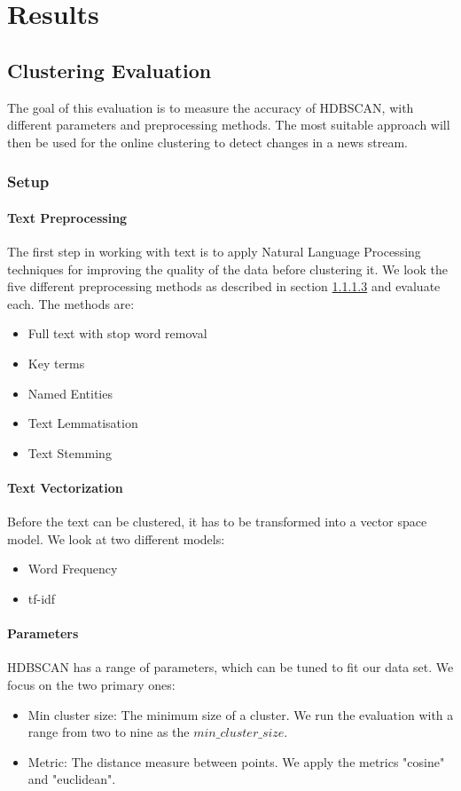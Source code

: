 \section{Results}

\subsection{Clustering Evaluation}

The goal of this evaluation is to measure the accuracy of HDBSCAN, with different parameters and preprocessing methods. The most suitable approach will then be used for the online clustering to detect changes in a news stream.

\subsubsection{Setup}

\paragraph{Text Preprocessing}

 The first step in working with text is to apply Natural Language Processing techniques for improving the quality of the data before clustering it. We look the five different preprocessing methods  as described in section \ref{} and evaluate each. The methods are:
 \begin{itemize}
     \item Full text with stop word removal
     \item Key terms
     \item Named Entities
     \item Text Lemmatisation
     \item Text Stemming
 \end{itemize} 

\paragraph{Text Vectorization} Before the text can be clustered, it has to be transformed into a vector space model. We look at two different models:
\begin{itemize}
    \item Word Frequency
    \item tf-idf
\end{itemize}

\paragraph{Parameters} HDBSCAN has a range of parameters, which can be tuned to fit our data set. We focus on the two primary ones:
\begin{itemize}
    \item Min cluster size: The minimum size of a cluster. We run the evaluation with a range from two to nine as the $min\_cluster\_size$. 
    \item Metric: The distance measure between points. We apply the metrics "cosine" and "euclidean". 
    
\end{itemize}

